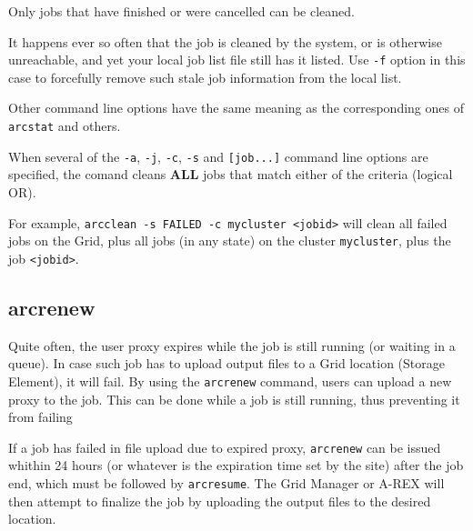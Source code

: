 Only jobs that have finished or were cancelled can be cleaned.

It happens ever so often that the job is cleaned by the system, or is otherwise unreachable, and yet your
local job list file still has it listed. Use \verb#-f# option in this case to forcefully remove such stale job
information from the local list.

Other command line options have the same meaning as the corresponding ones of \verb#arcstat# and others.

\begin{framed}
  When several of the \verb#-a#,  \verb#-j#, \verb#-c#, \verb#-s# and \verb#[job...]#
  command line options are specified, the comand cleans \textbf{ALL} jobs that
  match either of the criteria (logical OR).

  For example, \verb#arcclean -s FAILED -c mycluster <jobid># will clean all failed
  jobs on the Grid, plus all jobs (in any state) on the cluster \verb#mycluster#, plus the job \verb#<jobid>#.
\end{framed}


\subsection{arcrenew}
\label{sec:arcrenew}

Quite often, the user proxy expires while the job is still running (or
waiting in a queue). In case such job has to upload output files to a
Grid location (Storage Element), it will fail. By using the \texttt{arcrenew}
 command, users can upload
a new proxy to the job. This can be done while a job is still running,
thus preventing it from failing

If a job has failed in file upload due to expired proxy, \texttt{arcrenew}
can be issued whithin 24 hours (or whatever is
the expiration time set by the site) after the job
end, which must be followed by \texttt{arcresume}. The Grid
Manager or A-REX will then attempt to finalize
the job by uploading the output files to the desired location.

